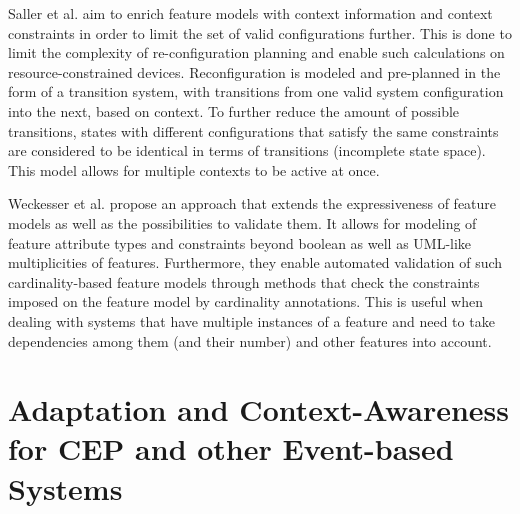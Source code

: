 Saller et al. aim to enrich feature models with context information and context constraints in order to limit the set of valid configurations further. This is done to limit the complexity of re-configuration planning and enable such calculations on resource-constrained devices. Reconfiguration is modeled and pre-planned in the form of a transition system, with transitions from one valid system configuration into the next, based on context. To further reduce the amount of possible transitions, states with different configurations that satisfy the same constraints are considered to be identical in terms of transitions (incomplete state space). This model allows for multiple contexts to be active at once.

Weckesser et al. propose an approach that extends the expressiveness of feature models as well as the possibilities to validate them. It allows for modeling  of feature attribute types and constraints beyond boolean as well as UML-like multiplicities of features. Furthermore, they enable automated validation of such cardinality-based feature models through methods that check the constraints imposed on the feature model by cardinality annotations. This is useful when dealing with systems that have multiple instances of a feature and need to take dependencies among them (and their number) and other features into account.

\section{Adaptation and Context-Awareness for CEP and other Event-based Systems}

